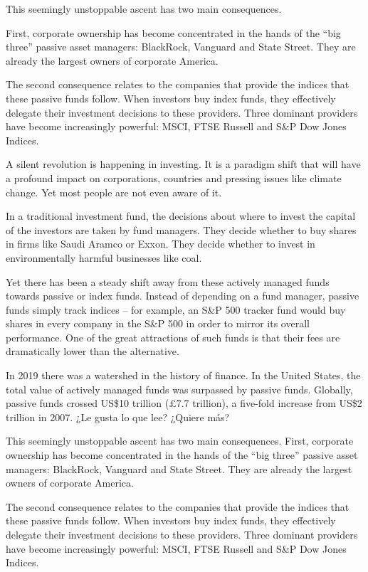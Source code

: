 \documentclass[
]{book}
\begin{document}
This seemingly unstoppable ascent has two main consequences.

First, corporate ownership has become concentrated in the hands of the ``big three'' passive asset managers: BlackRock, Vanguard and State Street. They are already the largest owners of corporate America.

The second consequence relates to the companies that provide the indices that these passive funds follow. When investors buy index funds, they effectively delegate their investment decisions to these providers. Three dominant providers have become increasingly powerful: MSCI, FTSE Russell and S\&P Dow Jones Indices.

A silent revolution is happening in investing. It is a paradigm shift that will have a profound impact on corporations, countries and pressing issues like climate change. Yet most people are not even aware of it.

In a traditional investment fund, the decisions about where to invest the capital of the investors are taken by fund managers. They decide whether to buy shares in firms like Saudi Aramco or Exxon. They decide whether to invest in environmentally harmful businesses like coal.

Yet there has been a steady shift away from these actively managed funds towards passive or index funds. Instead of depending on a fund manager, passive funds simply track indices -- for example, an S\&P 500 tracker fund would buy shares in every company in the S\&P 500 in order to mirror its overall performance. One of the great attractions of such funds is that their fees are dramatically lower than the alternative.

In 2019 there was a watershed in the history of finance. In the United States, the total value of actively managed funds was surpassed by passive funds. Globally, passive funds crossed US\$10 trillion (£7.7 trillion), a five-fold increase from US\$2 trillion in 2007.
¿Le gusta lo que lee? ¿Quiere más?

This seemingly unstoppable ascent has two main consequences. First, corporate ownership has become concentrated in the hands of the ``big three'' passive asset managers: BlackRock, Vanguard and State Street. They are already the largest owners of corporate America.

The second consequence relates to the companies that provide the indices that these passive funds follow. When investors buy index funds, they effectively delegate their investment decisions to these providers. Three dominant providers have become increasingly powerful: MSCI, FTSE Russell and S\&P Dow Jones Indices.
\end{document}
